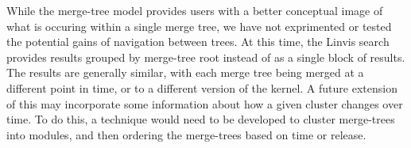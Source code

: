 While the merge-tree model provides users with a better conceptual image
of what is occuring within a single merge tree, we have not exprimented
or tested the potential gains of navigation between trees. At this time,
the Linvis search provides results grouped by merge-tree root instead of
as a single block of results. The results are generally similar, with
each merge tree being merged at a different point in time, or to a
different version of the kernel. A future extension of this may
incorporate some information about how a given cluster changes over
time. To do this, a technique would need to be developed to cluster
merge-trees into modules, and then ordering the merge-trees based on
time or release.

